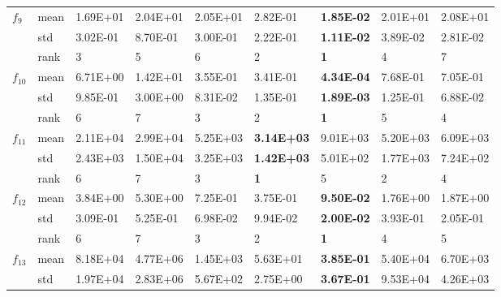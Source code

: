 \documentclass[a4paper,13pt,2p]{report}
\begin{document}
\begin{table}[!t]
\begin{tabular}{|l|l|l|l|l|l|l|l|l|}
                     \multirow{3}{*}{$f_9$}  & mean & 1.69E+01 & 2.04E+01 & 2.05E+01 & 2.82E-01          & \textbf{1.85E-02}  & 2.01E+01 & 2.08E+01          \\ \cline{2-9} 
                     & std  & 3.02E-01 & 8.70E-01 & 3.00E-01 & 2.22E-01          & \textbf{1.11E-02}  & 3.89E-02 & 2.81E-02          \\ \cline{2-9} 
                     & rank & 3        & 5        & 6        & 2                 & \textbf{1}         & 4        & 7                 \\ \hline
\multirow{3}{*}{$f_{10}$} & mean & 6.71E+00 & 1.42E+01 & 3.55E-01 & 3.41E-01          & \textbf{4.34E-04}  & 7.68E-01 & 7.05E-01          \\ \cline{2-9} 
                     & std  & 9.85E-01 & 3.00E+00 & 8.31E-02 & 1.35E-01          & \textbf{1.89E-03}  & 1.25E-01 & 6.88E-02          \\ \cline{2-9} 
                     & rank & 6        & 7        & 3        & 2                 & \textbf{1}         & 5        & 4                 \\ \hline
\multirow{3}{*}{$f_{11}$} & mean & 2.11E+04 & 2.99E+04 & 5.25E+03 & \textbf{3.14E+03} & 9.01E+03           & 5.20E+03 & 6.09E+03          \\ \cline{2-9} 
                     & std  & 2.43E+03 & 1.50E+04 & 3.25E+03 & \textbf{1.42E+03} & 5.01E+02           & 1.77E+03 & 7.24E+02          \\ \cline{2-9} 
                     & rank & 6        & 7        & 3        & \textbf{1}        & 5                  & 2        & 4                 \\ \hline
\multirow{3}{*}{$f_{12}$} & mean & 3.84E+00 & 5.30E+00 & 7.25E-01 & 3.75E-01          & \textbf{9.50E-02}  & 1.76E+00 & 1.87E+00          \\ \cline{2-9} 
                     & std  & 3.09E-01 & 5.25E-01 & 6.98E-02 & 9.94E-02          & \textbf{2.00E-02}  & 3.93E-01 & 2.05E-01          \\ \cline{2-9} 
                     & rank & 6        & 7        & 3        & 2                 & \textbf{1}         & 4        & 5                 \\ \hline
\multirow{3}{*}{$f_{13}$} & mean & 8.18E+04 & 4.77E+06 & 1.45E+03 & 5.63E+01          & \textbf{3.85E-01}  & 5.40E+04 & 6.70E+03          \\ \cline{2-9} 
                     & std  & 1.97E+04 & 2.83E+06 & 5.67E+02 & 2.75E+00          & \textbf{3.67E-01}  & 9.53E+04 & 4.26E+03          \\ \cline{2-9} 

\end{tabular}
\end{table}
\end{document}
